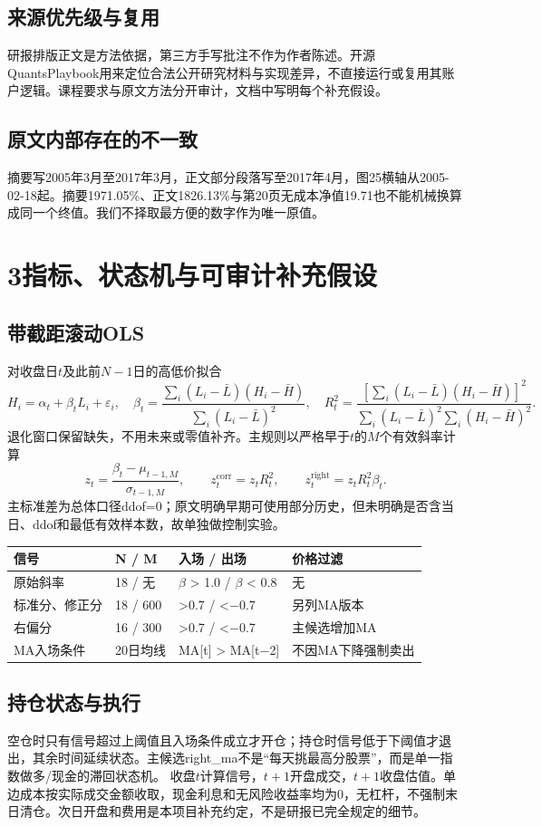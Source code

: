 \documentclass[UTF8,a4paper,10pt]{ctexart}
\newcommand{\page}[1]{\newpage\section*{#1}}
\begin{document}
\subsection*{来源优先级与复用}
研报排版正文是方法依据，第三方手写批注不作为作者陈述。开源QuantsPlaybook用来定位合法公开研究材料与实现差异，不直接运行或复用其账户逻辑。课程要求与原文方法分开审计，文档中写明每个补充假设。
\subsection*{原文内部存在的不一致}
摘要写2005年3月至2017年3月，正文部分段落写至2017年4月，图25横轴从2005-02-18起。摘要1971.05\%、正文1826.13\%与第20页无成本净值19.71也不能机械换算成同一个终值。我们不择取最方便的数字作为唯一原值。

\page{3\quad 指标、状态机与可审计补充假设}
\subsection*{带截距滚动OLS}
对收盘日$t$及此前$N-1$日的高低价拟合
\[H_i=\alpha_t+\beta_tL_i+\varepsilon_i,\quad
\beta_t=\frac{\sum_i(L_i-\bar L)(H_i-\bar H)}{\sum_i(L_i-\bar L)^2},\quad
R_t^2=\frac{[\sum_i(L_i-\bar L)(H_i-\bar H)]^2}{\sum_i(L_i-\bar L)^2\sum_i(H_i-\bar H)^2}.\]
退化窗口保留缺失，不用未来或零值补齐。主规则以严格早于$t$的$M$个有效斜率计算
\[z_t=\frac{\beta_t-\mu_{t-1,M}}{\sigma_{t-1,M}},\qquad
z_t^{\mathrm{corr}}=z_tR_t^2,\qquad z_t^{\mathrm{right}}=z_tR_t^2\beta_t.\]
主标准差为总体口径ddof=0；原文明确早期可使用部分历史，但未明确是否含当日、ddof和最低有效样本数，故单独做控制实验。

\begin{center}\small\begin{tabularx}{\textwidth}{Xlll}\toprule
信号 & N / M & 入场 / 出场 & 价格过滤\\\midrule
原始斜率 & 18 / 无 & \ensuremath{\beta} > 1.0 / \ensuremath{\beta} < 0.8 & 无\\
标准分、修正分 & 18 / 600 & >0.7 / <\ensuremath{-}0.7 & 另列MA版本\\
右偏分 & 16 / 300 & >0.7 / <\ensuremath{-}0.7 & 主候选增加MA\\
MA入场条件 & 20日均线 & MA[t] > MA[t\ensuremath{-}2] & 不因MA下降强制卖出\\
\bottomrule\end{tabularx}\end{center}
\subsection*{持仓状态与执行}
空仓时只有信号超过上阈值且入场条件成立才开仓；持仓时信号低于下阈值才退出，其余时间延续状态。主候选right\_ma不是“每天挑最高分股票”，而是单一指数做多/现金的滞回状态机。
收盘$t$计算信号，$t+1$开盘成交，$t+1$收盘估值。单边成本按实际成交金额收取，现金利息和无风险收益率均为0，无杠杆，不强制末日清仓。次日开盘和费用是本项目补充约定，不是研报已完全规定的细节。
\end{document}
